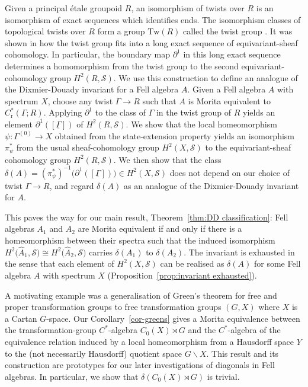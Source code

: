 \documentclass[12pt,a4paper]{amsart}
\newcommand{\red}{\operatorname{r}}
\newcommand{\Tgerms}{\mathcal{S}}
\newcommand{\tgcsa}[2]{\ensuremath{C^*_{\red}(#1 ; #2)}}
\begin{document}
Given a principal \'etale groupoid $R$, an isomorphism of
twists over $R$ is an isomorphism of exact sequences which
identifies ends. The isomorphism classes of topological twists
over $R$ form a group $\mathrm{Tw}(R)$ called the twist group
\cite{Kumjian1985}. It was shown in \cite{Kumjian1988} how the
twist group fits into a long exact sequence of
equivariant-sheaf cohomology. In particular, the boundary map
$\partial^1$ in this long exact sequence determines a
homomorphism from the twist group to the second
equivariant-cohomology group $H^2(R, \Tgerms)$. We use this
construction to define an analogue of the Dixmier-Douady
invariant for a Fell algebra $A$. Given a Fell algebra $A$ with
spectrum $X$, choose any twist $\Gamma \to R$ such that $A$ is
Morita equivalent to $\tgcsa{\Gamma}{R}$. Applying $\partial^1$
to the class of $\Gamma$ in the twist group of $R$ yields an
element $\partial^1([\underline{\Gamma}])$ of $H^2(R,
\Tgerms)$. We show that the local homeomorphism $\psi :
\Gamma^{(0)} \to X$ obtained from the state-extension property
yields an isomorphism $\pi^*_\psi$ from the usual
sheaf-cohomology group $H^2(X, \Tgerms)$ to the
equivariant-sheaf cohomology group $H^2(R, \Tgerms)$. We then
show that the class $\delta(A) =
(\pi^*_\psi)^{-1}\big(\partial^1([\underline{\Gamma}])\big) \in
H^2(X, \Tgerms)$ does not depend on our choice of twist $\Gamma
\to R$, and regard $\delta(A)$ as an analogue of the
Dixmier-Douady invariant for $A$.

This paves the way for our main result, Theorem~\ref{thm:DD
classification}: Fell algebras $A_1$ and $A_2$ are Morita
equivalent if and only if there is a homeomorphism between
their spectra such that the induced isomorphism
$H^2\big(\widehat{A}_1, \Tgerms\big) \cong
H^2\big(\widehat{A}_2, \Tgerms\big)$
carries $\delta(A_1)$ to $\delta(A_2)$. The invariant is exhausted in
the sense that each element of $H^2(X, \Tgerms)$ can be
realised as $\delta(A)$ for some Fell algebra $A$ with spectrum
$X$ (Proposition~\ref{prop:invariant exhausted}).

A motivating example was a generalisation of Green's theorem
for free and proper transformation groups to free
transformation groups $(G, X)$ where $X$ is a Cartan $G$-space.
Our Corollary~\ref{cor-greens} gives a Morita equivalence
between the transformation-group $C^*$-algebra $C_0(X) \rtimes
G$ and the  $C^*$-algebra of the equivalence relation
induced by a local homeomorphism from a Hausdorff space $Y$ to
the (not necessarily Hausdorff) quotient space $G\backslash X$.
This result and its construction are prototypes for our later
investigations of diagonals in Fell algebras. In particular, we
show that $\delta(C_0(X) \rtimes G)$  is trivial.
\end{document}
